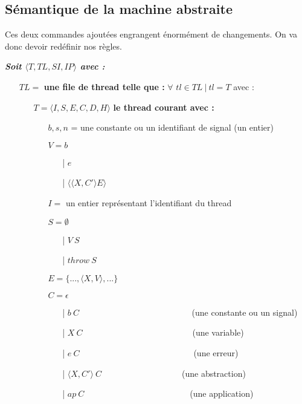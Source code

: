 \documentclass[10pt,a4paper]{report}
\begin{document}
 	\newpage 
	
	
	
	\subsection{Sémantique de la machine abstraite}
	
	Ces deux commandes ajoutées engrangent énormément de changements. On va donc devoir redéfinir nos règles. 
	\bigbreak
	
	\textbf{\textit{Soit $\langle T,TL,SI,IP\rangle$ avec :}}
	
	\begin{itemize}
		\item[] $TL =$ \textbf{une file de thread telle que :} $\forall$ $tl \in TL~|~tl = T$ avec :
		\begin{itemize}
			\item[] $T = \langle I,S,E,C,D,H\rangle$ \textbf{le thread courant avec :}
			\begin{itemize}
				\item[] $b,s,n$ = une constante ou un identifiant de signal (un entier)
				\item[] $V = b$	
				\begin{itemize}
					\item[|] $e$
					\item[|] $\langle\langle X,C' \rangle E\rangle$
				\end{itemize}
				\item[] $I =$ un entier représentant l'identifiant du thread
				\item[] $S =  \emptyset$ 
				\begin{itemize}
					\item[|] $V~S$
					\item[|] $throw~S$
				\end{itemize}
				\item[] $E = \{...,\langle X,V\rangle,...\}$
				\item[] $C = \epsilon$
				\begin{itemize}
					\item[|] $b~C$~~~~~~~~~~~~~~~~~~~~~~~~~~ (une constante ou un signal)
					\item[|] $X~C$~~~~~~~~~~~~~~~~~~~~~~~~~~(une variable)
					\item[|] $e~C$~~~~~~~~~~~~~~~~~~~~~~~~~~~(une erreur)
					\item[|] $\langle X,C'\rangle~C$~~~~~~~~~~~~~~~~~~~(une abstraction)
					\item[|] $ap~C$~~~~~~~~~~~~~~~~~~~~~~~~~(une application)

\end{itemize}
\end{itemize}
\end{itemize}
\end{itemize}
\end{document}
